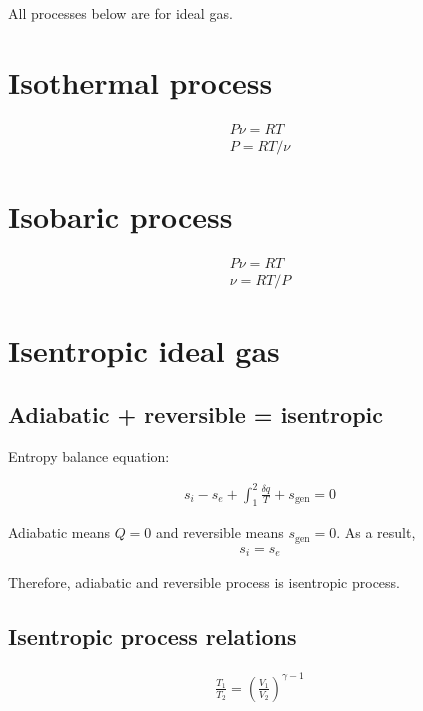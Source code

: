 \documentclass{article}
\begin{document}
    All processes below are for ideal gas.
	
		\section{Isothermal process}
		
		\begin{align*}
			P\nu = RT\\
			P = RT/\nu			
		\end{align*}

		\section{Isobaric process}
		
		\begin{align*}
			P\nu = RT\\
            \nu = RT/P
		\end{align*}
	
		\section{Isentropic ideal gas}
		
		\subsection{Adiabatic + reversible = isentropic}
		
		Entropy balance equation:
		
		\begin{align*}
			s_i - s_e + \int_1^2\frac{\delta q}{T} + s_\text{gen} = 0			
		\end{align*}
	
		
	
		Adiabatic means $Q=0$ and reversible means $s_\text{gen}=0$. As a result,
		\begin{align*}
			s_i = s_e
		\end{align*}
	
		Therefore, adiabatic and reversible process is isentropic process.
		
		\subsection{Isentropic process relations}
	
		\begin{align*}
			\frac{T_1}{T_2} = \left(\frac{V_1}{V_2}\right)^{\gamma-1}
		\end{align*}
	
\end{document}
